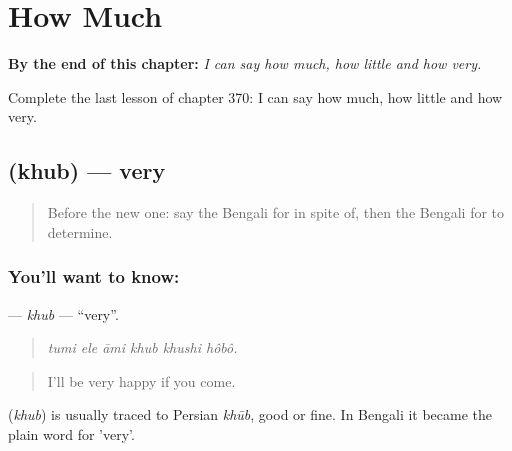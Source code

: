 
\chapter{How Much}
\label{ch:bn-how-much}

\begin{chapteropening}
\textbf{By the end of this chapter:} \emph{I can say how much, how little and how very.}

Complete the last lesson of chapter 370: I can say how much, how little and how very.
\end{chapteropening}

\section[\texorpdfstring{\bn{খুব} (khub)}{খুব (khub)}]{ (khub) — very}

\label{lesson:BN-C370-khub}



\begin{quote}
Before the new one: say the Bengali for in spite of, then the Bengali for to determine.
\end{quote}

\subsection*{You'll want to know: }
\textbf{} — \emph{khub} — \textquotedblleft{}very\textquotedblright{}.

\begin{quote}
     
\end{quote}

\begin{quote}
\emph{tumi ele āmi khub khushi hôbô.}
\end{quote}

\begin{quote}
I'll be very happy if you come.
\end{quote}

\begin{cousinweb}
\textbf{} (\emph{khub}) is usually traced to Persian \emph{khūb}, good or fine. In Bengali it became the plain word for 'very'.
\end{cousinweb}

